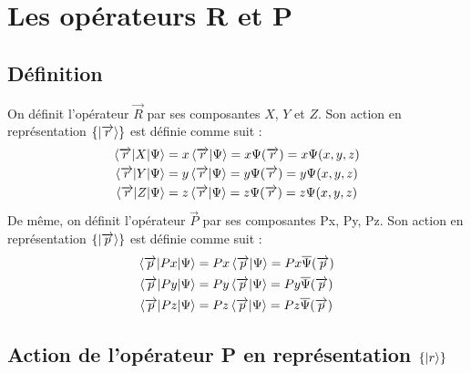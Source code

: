 \documentclass[12pt,a4paper,titlepage]{book}
\begin{document}
\section{Les opérateurs R et P}

\subsection{Définition}

On définit l'opérateur $\overrightarrow{R}$ par ses composantes $X$, $Y$ et $Z$. Son action en représentation $\lbrace \ket{\overrightarrow{r}} \rbrace$ est définie comme suit :
\begin{align*}
\braket{\overrightarrow{r} \vert X \vert \Psi} &= x \braket{\overrightarrow{r} \vert \Psi} = x \Psi (\overrightarrow{r}) = x \Psi (x,y,z)\\
\braket{\overrightarrow{r} \vert Y \vert \Psi} &= y \braket{\overrightarrow{r} \vert \Psi} = y \Psi (\overrightarrow{r}) = y \Psi (x,y,z)\\
\braket{\overrightarrow{r} \vert Z \vert \Psi} &= z \braket{\overrightarrow{r} \vert \Psi} = z \Psi (\overrightarrow{r}) = z \Psi (x,y,z)
\end{align*}
De même, on définit l'opérateur $\overrightarrow{P}$ par ses composantes Px, Py, Pz. Son action en représentation $\lbrace \ket{\overrightarrow{p}} \rbrace$ est définie comme suit :
\begin{align*}
\braket{\overrightarrow{p} \vert Px \vert \Psi} &= Px \braket{\overrightarrow{p} \vert \Psi} = Px \overline{\Psi} (\overrightarrow{p})\\
\braket{\overrightarrow{p} \vert Py \vert \Psi} &= Py \braket{\overrightarrow{p} \vert \Psi} = Py \overline{\Psi} (\overrightarrow{p}) \\
\braket{\overrightarrow{p} \vert Pz \vert \Psi} &= Pz \braket{\overrightarrow{p} \vert \Psi} = Pz \overline{\Psi} (\overrightarrow{p})
\end{align*}

\subsection{Action de l'opérateur P en représentation $\lbrace \ket r \rbrace$}
\end{document}
